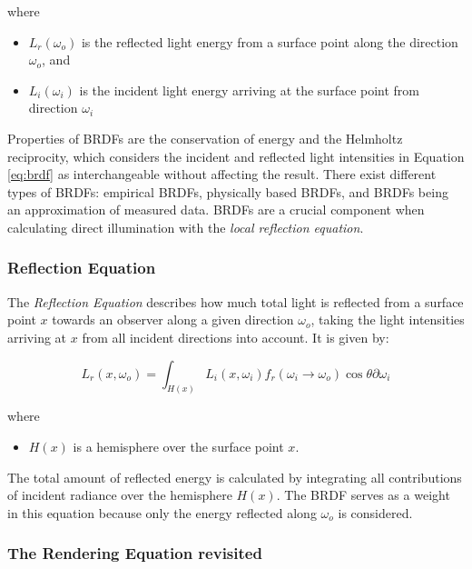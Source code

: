 \noindent where
\begin{itemize}
	\setlength\itemsep{0.05em}
	\item  $L_{r}(\omega_{o})$ is the reflected light energy from a surface point along the direction $\omega_{o}$, and
	\item  $L_{i}(\omega_{i})$ is the incident light energy arriving at the surface point from direction $\omega_{i}$ 
\end{itemize}

Properties of BRDFs are the conservation of energy and the Helmholtz reciprocity, which considers the incident and reflected light intensities in Equation \ref{eq:brdf} as interchangeable without affecting the result. There exist different types of BRDFs: empirical BRDFs, physically based BRDFs, and BRDFs being an approximation of measured data.
BRDFs are a crucial component when calculating direct illumination with the \emph{local reflection equation}.

\subsubsection{Reflection Equation}

The \emph{Reflection Equation} describes how much total light is reflected from a surface point $x$ towards an observer along a given direction $\omega_{o}$, taking the light intensities arriving at $x$ from all incident directions into account. It is given by:

\begin{equation}\label{eq:local}
L_{r}(x, \omega_{o}) = \int_{H(x)} L_{i}(x, \omega_{i})f_{r}(\omega_{i} \rightarrow \omega_{o})\cos\theta\partial\omega_{i}
\end{equation}

\noindent where
\begin{itemize}
	\setlength\itemsep{0.05em}
	\item $H(x)$ is a hemisphere over the surface point $x$.
\end{itemize}
The total amount of reflected energy is calculated by integrating all contributions of incident radiance over the hemisphere $H(x)$. The BRDF serves as a weight in this equation because only the energy reflected along $\omega_{o}$ is considered.
 
\subsubsection{The Rendering Equation revisited}

